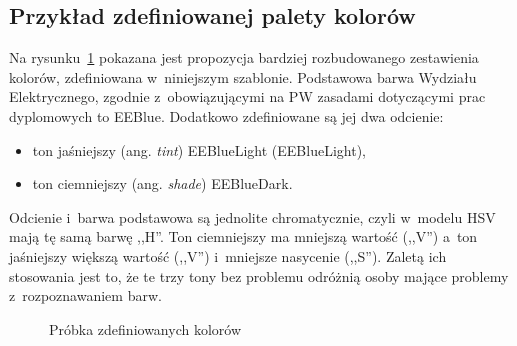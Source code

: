 \subsection{Przykład zdefiniowanej palety kolorów}
Na rysunku~\ref{rys:colorsample}
pokazana jest propozycja bardziej rozbudowanego zestawienia kolorów, zdefiniowana w~niniejszym szablonie. Podstawowa
barwa Wydziału Elektrycznego, zgodnie z~obowiązującymi na PW zasadami dotyczącymi prac dyplomowych to
\textcolor{EEBlue}{EEBlue}. Dodatkowo zdefiniowane są jej dwa odcienie:
\begin{itemize}
    \item ton jaśniejszy (ang. \textit{tint}) \textcolor{EEBlueLight}{EEBlueLight} (EEBlueLight),
    \item ton ciemniejszy (ang. \textit{shade}) \textcolor{EEBlueDark}{EEBlueDark}.
\end{itemize}
Odcienie i~barwa podstawowa są jednolite chromatycznie, czyli w~modelu HSV mają tę samą barwę ,,H''. Ton ciemniejszy ma
mniejszą wartość (,,V'') a~ton jaśniejszy większą wartość (,,V'') i~mniejsze nasycenie (,,S''). Zaletą ich stosowania
jest to, że te trzy tony bez problemu odróżnią osoby mające problemy z~rozpoznawaniem barw.

\begin{figure}[!ht]
    \centering
    \caption{Próbka zdefiniowanych kolorów}
    \label{rys:colorsample}
\end{figure}


